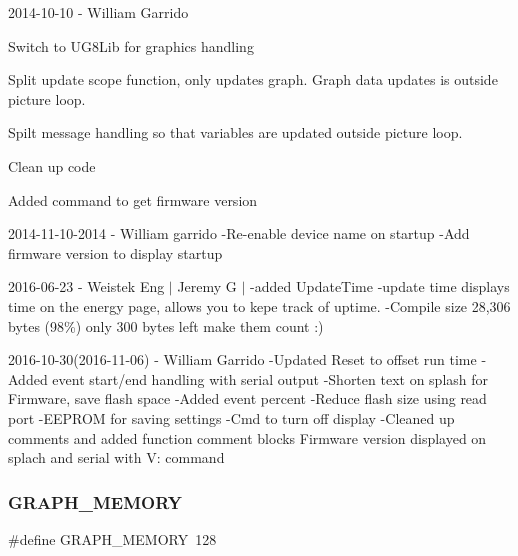 2014-\/10-\/10 -\/ William Garrido
\begin{DoxyItemize}
\item Switch to U\+G8\+Lib for graphics handling
\item Split update scope function, only updates graph. Graph data updates is outside picture loop.
\item Spilt message handling so that variables are updated outside picture loop.
\item Clean up code
\item Added command to get firmware version
\end{DoxyItemize}

2014-\/11-\/10-\/2014 -\/ William garrido -\/\+Re-\/enable device name on startup -\/\+Add firmware version to display startup

2016-\/06-\/23 -\/ Weistek Eng $\vert$ Jeremy G $\vert$ -\/added Update\+Time -\/update time displays time on the energy page, allows you to kepe track of uptime. -\/\+Compile size 28,306 bytes (98\%) only 300 bytes left make them count \+:)

2016-\/10-\/30(2016-\/11-\/06) -\/ William Garrido -\/\+Updated Reset to offset run time -\/\+Added event start/end handling with serial output -\/\+Shorten text on splash for Firmware, save flash space -\/\+Added event percent -\/\+Reduce flash size using read port -\/\+E\+E\+P\+R\+OM for saving settings -\/\+Cmd to turn off display -\/\+Cleaned up comments and added function comment blocks Firmware version displayed on splach and serial with V\+: command \hypertarget{_u_s_b___tester___o_l_e_d__128x64___beta__2_82_8ino_a2c0a8e83033b6e3ab82b31600463e2f8}{}\label{_u_s_b___tester___o_l_e_d__128x64___beta__2_82_8ino_a2c0a8e83033b6e3ab82b31600463e2f8} 
\subsubsection{\texorpdfstring{G\+R\+A\+P\+H\+\_\+\+M\+E\+M\+O\+RY}{GRAPH\_MEMORY}}
{\footnotesize\ttfamily \#define G\+R\+A\+P\+H\+\_\+\+M\+E\+M\+O\+RY~128}

